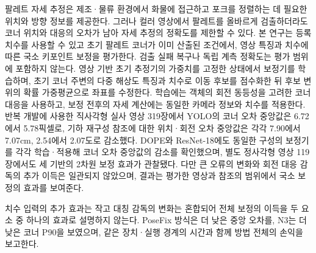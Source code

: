 팔레트 자세 추정은 제조·물류 환경에서 화물에 접근하고 포크를 정렬하는 데 필요한 위치와 방향 정보를 제공한다.
그러나 컬러 영상에서 팔레트를 올바르게 검출하더라도 코너 위치와 대응의 오차가 남아 자세 추정의 정확도를 제한할 수 있다.
본 연구는 등록 치수를 사용할 수 있고 초기 팔레트 코너가 이미 산출된 조건에서, 영상 특징과 치수에 따른 국소 키포인트 보정을 평가한다. 검출 실패 복구나 독립 계측 정확도는 평가 범위에 포함하지 않는다.
영상 기반 초기 추정기의 가중치를 고정한 상태에서 보정기를 학습하며, 초기 코너 주변의 다중 해상도 특징과 치수로 이동 후보를 점수화한 뒤 후보 변위의 확률 가중평균으로 좌표를 수정한다.
학습에는 객체의 회전 동등성을 고려한 코너 대응을 사용하고, 보정 전후의 자세 계산에는 동일한 카메라 정보와 치수를 적용한다.
반복 개발에 사용한 직사각형 실사 영상 319장에서 YOLO의 코너 오차 중앙값은 6.72에서 5.78픽셀로, 기하 재구성 참조에 대한 위치·회전 오차 중앙값은 각각 7.90에서 7.07cm, 2.54에서 2.07도로 감소했다.
DOPE와 ResNet-18에도 동일한 구성의 보정기를 각각 학습·적용해 코너 오차 중앙값의 감소를 확인했으며, 별도 정사각형 영상 119장에서도 세 기반의 2차원 보정 효과가 관찰됐다.
다만 큰 오류의 변화와 회전 대응 감독의 추가 이득은 일관되지 않았으며, 결과는 평가한 영상과 참조의 범위에서 국소 보정의 효과를 보여준다.

치수 입력의 추가 효과는 작고 대칭 감독의 변화는 혼합되어 전체 보정의 이득을 두 요소 중 하나의 효과로 설명하지 않는다. PoseFix 방식은 더 낮은 중앙 오차를, N3는 더 낮은 코너 P90을 보였으며, 같은 장치·실행 경계의 시간과 함께 방법 전체의 손익을 보고한다.
